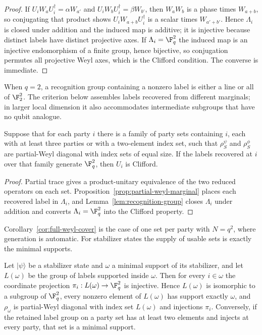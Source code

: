 \begin{proof}
If \(U_iW_aU_i^\dagger=\alpha W_{a'}\) and \(U_iW_bU_i^\dagger=\beta W_{b'}\),
then \(W_aW_b\) is a phase times \(W_{a+b}\), so conjugating that product
shows \(U_iW_{a+b}U_i^\dagger\) is a scalar times \(W_{a'+b'}\).  Hence
\(\Lambda_i\) is closed under addition and the induced map is additive; it
is injective because distinct labels have distinct projective axes.  If
\(\Lambda_i=\F_q^2\) the induced map is an injective endomorphism of a
finite group, hence bijective, so conjugation permutes all projective Weyl
axes, which is the Clifford condition.  The converse is immediate.
\end{proof}

When \(q=2\), a recognition group containing a nonzero label is either a
line or all of \(\F_2^2\).  The criterion below assembles labels recovered
from different marginals; in larger local dimension it also accommodates
intermediate subgroups that have no qubit analogue.

\begin{corollary}\label{cor:recognition-generation}
Suppose that for each party \(i\) there is a family of party sets
containing \(i\), each with at least three parties or with a two-element
index set, such that \(\rho^\psi_S\) and \(\rho^\phi_S\) are partial-Weyl
diagonal with index sets of equal size.  If the labels recovered at \(i\)
over that family generate \(\F_q^2\), then \(U_i\) is Clifford.
\end{corollary}

\begin{proof}
Partial trace gives a product-unitary equivalence of the two reduced
operators on each set.  Proposition~\ref{prop:partial-weyl-marginal} places
each recovered label in \(\Lambda_i\), and
Lemma~\ref{lem:recognition-group} closes \(\Lambda_i\) under addition and
converts \(\Lambda_i=\F_q^2\) into the Clifford property.
\end{proof}

Corollary~\ref{cor:full-weyl-cover} is the case of one set per party with
\(N=q^2\), where generation is automatic.  For stabilizer states the
supply of usable sets is exactly the minimal supports.

\begin{lemma}
\label{lem:minimal-support-charts}
Let \(\lvert\psi\rangle\) be a stabilizer state and \(\omega\) a minimal
support of its stabilizer, and let \(L(\omega)\) be the group of labels
supported inside \(\omega\).  Then for every \(i\in\omega\) the coordinate
projection \(\pi_i:L(\omega)\to\F_q^2\) is injective.  Hence \(L(\omega)\)
is isomorphic to a subgroup of \(\F_q^2\), every nonzero element of
\(L(\omega)\) has support exactly \(\omega\), and \(\rho_\omega\) is
partial-Weyl diagonal with index set \(L(\omega)\) and injections
\(\pi_i\).  Conversely, if the retained label group on a party set has at
least two elements and injects at every party, that set is a minimal
support.
\end{lemma}

